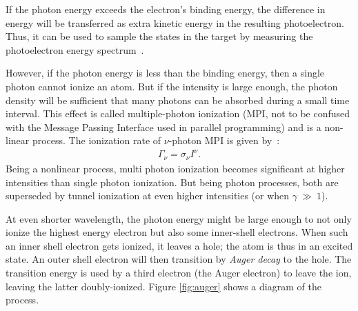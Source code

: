 If the photon energy exceeds the electron's binding energy, the difference in energy
will be transferred as extra kinetic energy in the
resulting photoelectron. Thus, it can be used to sample the states in the
target by measuring the photoelectron energy spectrum~\cite{Fennel2010}.

However, if the photon energy is less than the binding energy, then a single
photon cannot ionize an atom. But if the intensity is large enough, the
photon density will be sufficient that many photons can be absorbed during a
small time interval.
This effect is called multiple-photon ionization (MPI, not to
be confused with the Message Passing Interface used in parallel programming) and
is a non-linear process. The ionization rate of $\nu$-photon MPI is given
by~\cite{Fennel2010}:
\begin{align}
\Gamma_{\nu} = \sigma_{\nu} I^{\nu}.
\label{eqn:ionization:rate:mpi}
\end{align}
Being a nonlinear process, multi photon ionization becomes significant at higher
intensities than single photon ionization. But being photon processes, both are
superseded by tunnel ionization at even higher intensities (or when
$\gamma~\gg~1$).


{}

At even shorter wavelength, the photon energy might be large enough to not only
ionize the highest energy electron but also some inner-shell electrons.
When such an inner shell electron gets ionized, it leaves a hole; the atom is
thus in an excited state. An outer shell electron will then transition by
\textit{Auger decay} to the hole. The transition energy is used by a third
electron (the Auger electron) to leave the ion, leaving the latter
doubly-ionized. Figure \ref{fig:auger} shows a diagram of the process.

